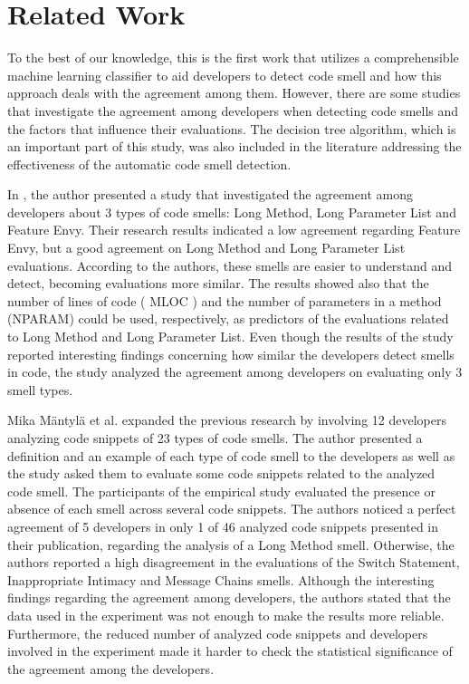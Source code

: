 \chapter{Related Work}
\label{sec:relateds}

To the best of our knowledge, this is the first work that utilizes a comprehensible machine learning classifier to aid developers to detect code smell and how this approach deals with the agreement among them. However, there are some studies that investigate the agreement among developers when detecting code smells and the factors that influence their evaluations. The decision tree algorithm, which is an important part of this study, was also included in the literature addressing the effectiveness of the automatic code smell detection. 

In \cite{mantyla2005experiment}, the author presented a study that investigated the agreement among developers about 3 types of code smells: Long Method, Long Parameter List and Feature Envy. Their research results indicated a low agreement regarding Feature Envy, but a good agreement on Long Method and Long Parameter List evaluations. According to the authors, these smells are easier to understand and detect, becoming evaluations more similar. The results showed also that the number of lines of code ( MLOC ) and the number of parameters in a method (NPARAM) could be used, respectively, as predictors of the evaluations related to Long Method and Long Parameter List. Even though the results of the study reported interesting findings concerning how similar the developers detect smells in code, the study analyzed the agreement among developers on evaluating only 3 smell types. 

Mika Mäntylä et al. \cite{mantyla2006subjective} expanded the previous research by involving 12 developers analyzing code snippets of 23 types of code smells. The author presented a definition and an example of each type of code smell to the developers as well as the study asked them to evaluate some code snippets related to the analyzed code smell. The participants of the empirical study evaluated the presence or absence of each smell across several code snippets. The authors noticed a perfect agreement of 5 developers in only 1 of 46 analyzed code snippets presented in their publication, regarding the analysis of a Long Method smell. Otherwise, the authors reported a high disagreement in the evaluations of the Switch Statement, Inappropriate Intimacy and Message Chains smells. Although the interesting findings regarding the agreement among developers, the authors stated that the data used in the experiment was not enough to make the results more reliable. Furthermore, the reduced number of analyzed code snippets and developers involved in the experiment made it harder to check the statistical significance of the agreement among the developers.

